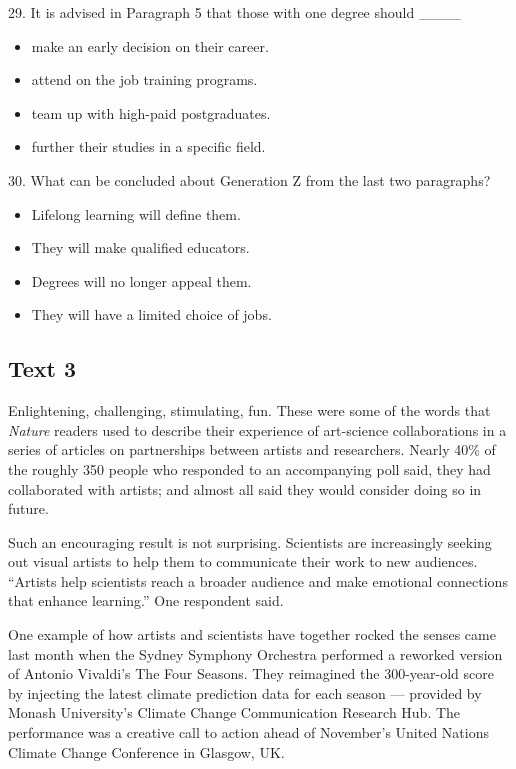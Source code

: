 \documentclass[UTF8,11pt]{ctexart}
\begin{document}
29. It is advised in Paragraph 5 that those with one degree should \_\_\_\_


\begin{itemize}[leftmargin=2em,itemsep=.2em,topsep=.4em]\item[A.] make an early decision on their career.
\item[B.] attend on the job training programs.
\item[C.] team up with high-paid postgraduates.
\item[D.] further their studies in a specific field.
\end{itemize}

30. What can be concluded about Generation Z from the last two paragraphs?


\begin{itemize}[leftmargin=2em,itemsep=.2em,topsep=.4em]\item[A.] Lifelong learning will define them.
\item[B.] They will make qualified educators.
\item[C.] Degrees will no longer appeal them.
\item[D.] They will have a limited choice of jobs.
\end{itemize}

\subsection*{\textbf{Text 3}}


Enlightening, challenging, stimulating, fun. These were some of the words that \textit{Nature} readers used to describe their experience of art-science collaborations in a series of articles on partnerships between artists and researchers. Nearly 40\% of the roughly 350 people who responded to an accompanying poll said, they had collaborated with artists; and almost all said they would consider doing so in future.


Such an encouraging result is not surprising. Scientists are increasingly seeking out visual artists to help them to communicate their work to new audiences. “Artists help scientists reach a broader audience and make emotional connections that enhance learning.” One respondent said.


One example of how artists and scientists have together rocked the senses came last month when the Sydney Symphony Orchestra performed a reworked version of Antonio Vivaldi’s The Four Seasons. They reimagined the 300-year-old score by injecting the latest climate prediction data for each season — provided by Monash University’s Climate Change Communication Research Hub. The performance was a creative call to action ahead of November’s United Nations Climate Change Conference in Glasgow, UK.
\end{document}
